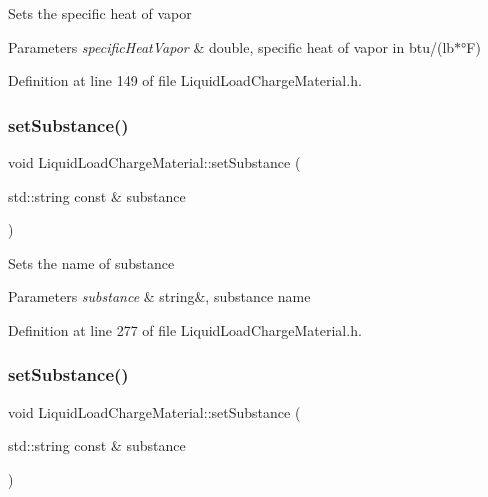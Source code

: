 Sets the specific heat of vapor 
\begin{DoxyParams}{Parameters}
{\em specific\+Heat\+Vapor} & double, specific heat of vapor in btu/(lb$\ast$°F) \\
\hline
\end{DoxyParams}


Definition at line 149 of file Liquid\+Load\+Charge\+Material.\+h.

\mbox{\label{class_liquid_load_charge_material_a85bb43270c6a11a1eaf51f00da16746a}} 
\subsubsection{\texorpdfstring{set\+Substance()}{setSubstance()}\hspace{0.1cm}{\footnotesize\ttfamily [1/3]}}
{\footnotesize\ttfamily void Liquid\+Load\+Charge\+Material\+::set\+Substance (\begin{DoxyParamCaption}\item[{std\+::string const \&}]{substance }\end{DoxyParamCaption})\hspace{0.3cm}{\ttfamily [inline]}}

Sets the name of substance 
\begin{DoxyParams}{Parameters}
{\em substance} & string\&, substance name \\
\hline
\end{DoxyParams}


Definition at line 277 of file Liquid\+Load\+Charge\+Material.\+h.

\mbox{\label{class_liquid_load_charge_material_a85bb43270c6a11a1eaf51f00da16746a}} 
\subsubsection{\texorpdfstring{set\+Substance()}{setSubstance()}\hspace{0.1cm}{\footnotesize\ttfamily [2/3]}}
{\footnotesize\ttfamily void Liquid\+Load\+Charge\+Material\+::set\+Substance (\begin{DoxyParamCaption}\item[{std\+::string const \&}]{substance }\end{DoxyParamCaption})\hspace{0.3cm}{\ttfamily [inline]}}

